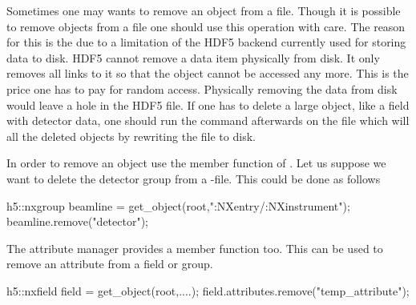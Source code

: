 Sometimes one may wants to remove an object from a file. Though it is possible
to remove objects from a file one should use this operation with care. 
The reason for this is the due to a limitation of the HDF5 backend currently
used for storing data to disk. HDF5 cannot remove a data item physically from
disk. It only removes all links to it so that the object cannot be accessed any
more. 
This is the price one has to pay for random access. Physically removing the data
from disk would leave a hole in the HDF5 file. 
If one has to delete a large object, like a field with detector data, one should
run the  command afterwards on the file which will all the deleted
objects by rewriting the file to disk.

In order to remove an object use the  member function of \nxgroup. 
Let us suppose we want to delete the detector group from a \nexus-file. 
This could be done as follows
\begin{cppcode}
h5::nxgroup beamline = get_object(root,":NXentry/:NXinstrument");
beamline.remove("detector");
\end{cppcode}

The attribute manager provides a  member function too. This can be
used to remove an attribute from a field or group. 
\begin{cppcode}
h5::nxfield field = get_object(root,....);
field.attributes.remove("temp_attribute");
\end{cppcode}

